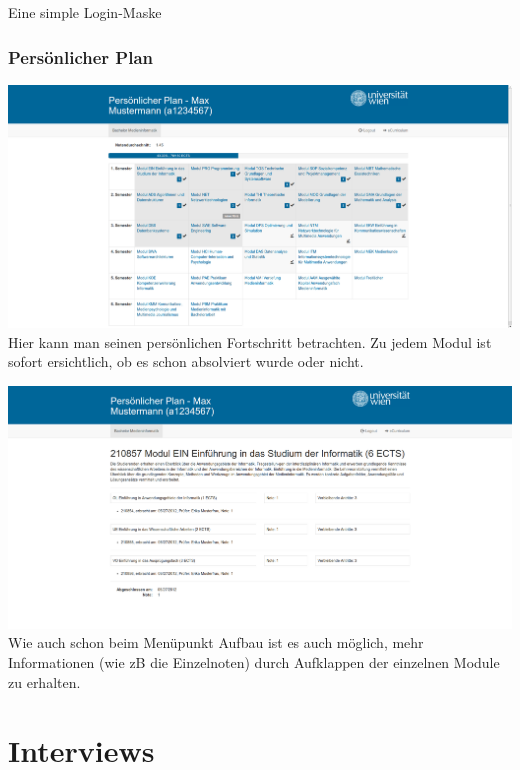 \documentclass[a4paper,10pt]{scrartcl}
\begin{document}
Eine simple Login-Maske

\subsubsection*{Persönlicher Plan}

\includegraphics[scale=0.19]{./hifi_screenshots/hifi_persplan.png}\\

Hier kann man seinen persönlichen Fortschritt betrachten. Zu jedem Modul ist sofort ersichtlich, ob es schon absolviert wurde oder nicht.

\includegraphics[scale=0.19]{./hifi_screenshots/hifi_persplan2.png}\\

Wie auch schon beim Menüpunkt Aufbau ist es auch möglich, mehr Informationen (wie zB die Einzelnoten) durch Aufklappen der einzelnen Module zu erhalten.

\section*{Interviews}

\end{document}
